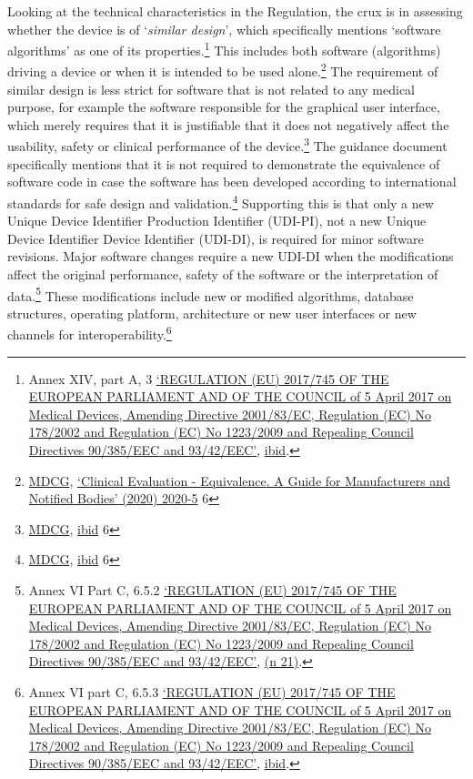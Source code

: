 \documentclass[
]{scrartcl}
\begin{document}
Looking at the technical characteristics in the Regulation, the crux is in assessing whether the device is of `\emph{similar design}', which specifically mentions `software algorithms' as one of its properties.\footnote{Annex XIV, part A, 3 \protect\hyperlink{ref-REGULATIONEU2017a}{{`{REGULATION} ({EU}) 2017/745 {OF THE EUROPEAN PARLIAMENT AND OF THE COUNCIL} of 5 {April} 2017 on Medical Devices, Amending {Directive} 2001/83/{EC}, {Regulation} ({EC}) {No} 178/2002 and {Regulation} ({EC}) {No} 1223/2009 and Repealing {Council Directives} 90/385/{EEC} and 93/42/{EEC}'}}, \protect\hyperlink{ref-REGULATIONEU2017a}{ibid}.} This includes both software (algorithms) driving a device or when it is intended to be used alone.\footnote{\protect\hyperlink{ref-mdcgClinicalEvaluationEquivalence2020}{MDCG}, \protect\hyperlink{ref-mdcgClinicalEvaluationEquivalence2020}{{`Clinical {Evaluation} - {Equivalence}. {A} Guide for Manufacturers and Notified Bodies'} (2020) 2020-5} 6} The requirement of similar design is less strict for software that is not related to any medical purpose, for example the software responsible for the graphical user interface, which merely requires that it is justifiable that it does not negatively affect the usability, safety or clinical performance of the device.\footnote{\protect\hyperlink{ref-mdcgClinicalEvaluationEquivalence2020}{MDCG}, \protect\hyperlink{ref-mdcgClinicalEvaluationEquivalence2020}{ibid} 6} The guidance document specifically mentions that it is not required to demonstrate the equivalence of software code in case the software has been developed according to international standards for safe design and validation.\footnote{\protect\hyperlink{ref-mdcgClinicalEvaluationEquivalence2020}{MDCG}, \protect\hyperlink{ref-mdcgClinicalEvaluationEquivalence2020}{ibid} 6} Supporting this is that only a new Unique Device Identifier Production Identifier (UDI-PI), not a new Unique Device Identifier Device Identifier (UDI-DI), is required for minor software revisions. Major software changes require a new UDI-DI when the modifications affect the original performance, safety of the software or the interpretation of data.\footnote{Annex VI Part C, 6.5.2 \protect\hyperlink{ref-REGULATIONEU2017a}{{`{REGULATION} ({EU}) 2017/745 {OF THE EUROPEAN PARLIAMENT AND OF THE COUNCIL} of 5 {April} 2017 on Medical Devices, Amending {Directive} 2001/83/{EC}, {Regulation} ({EC}) {No} 178/2002 and {Regulation} ({EC}) {No} 1223/2009 and Repealing {Council Directives} 90/385/{EEC} and 93/42/{EEC}'}}, \protect\hyperlink{ref-REGULATIONEU2017a}{(n 21)}.} These modifications include new or modified algorithms, database structures, operating platform, architecture or new user interfaces or new channels for interoperability.\footnote{Annex VI part C, 6.5.3 \protect\hyperlink{ref-REGULATIONEU2017a}{{`{REGULATION} ({EU}) 2017/745 {OF THE EUROPEAN PARLIAMENT AND OF THE COUNCIL} of 5 {April} 2017 on Medical Devices, Amending {Directive} 2001/83/{EC}, {Regulation} ({EC}) {No} 178/2002 and {Regulation} ({EC}) {No} 1223/2009 and Repealing {Council Directives} 90/385/{EEC} and 93/42/{EEC}'}}, \protect\hyperlink{ref-REGULATIONEU2017a}{ibid}.}
\end{document}
